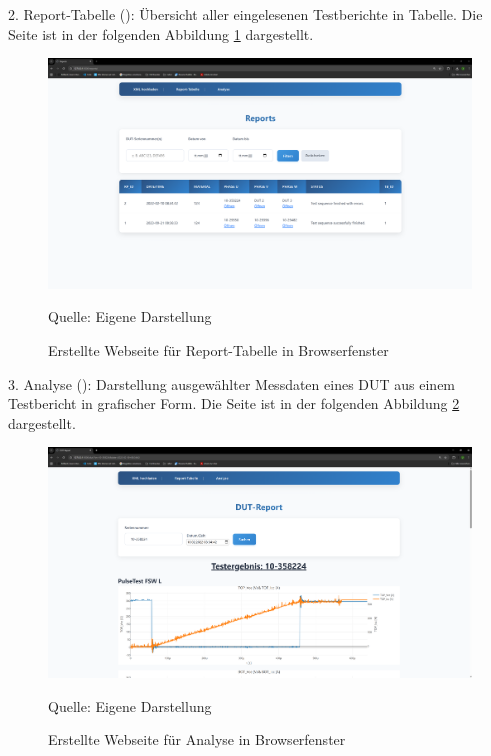 2. Report-Tabelle (): Übersicht aller eingelesenen Testberichte in Tabelle.
Die Seite ist in der folgenden Abbildung \ref{fig: Webseite für Report-Tabelle} dargestellt.

\begin{figure}[H]
    \centering
    \includegraphics[width=1\textwidth]{Grafiken/Bild Reports}
    \caption{Erstellte Webseite für Report-Tabelle in Browserfenster}
    \label{fig: Webseite für Report-Tabelle}
    {Quelle: Eigene Darstellung}
\end{figure}

3. Analyse (): Darstellung ausgewählter Messdaten eines DUT aus einem Testbericht in grafischer Form.
Die Seite ist in der folgenden Abbildung \ref{fig: Webseite für Analyse} dargestellt.

\begin{figure}[H]
    \centering
    \includegraphics[width=1\textwidth]{Grafiken/Bild DUT-Report}
    \caption{Erstellte Webseite für Analyse in Browserfenster}
    \label{fig: Webseite für Analyse}
    {Quelle: Eigene Darstellung}
\end{figure}


